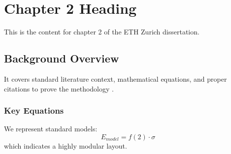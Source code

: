 \chapter{Chapter 2 Heading}
\label{ch:chapter2}
This is the content for chapter 2 of the ETH Zurich dissertation.

\section{Background Overview}
It covers standard literature context, mathematical equations, and proper citations to prove the methodology \cite{texbook}.

\subsection{Key Equations}
We represent standard models:
\begin{equation}
    E_{model} = f(2) \cdot \sigma
\end{equation}
which indicates a highly modular layout.
